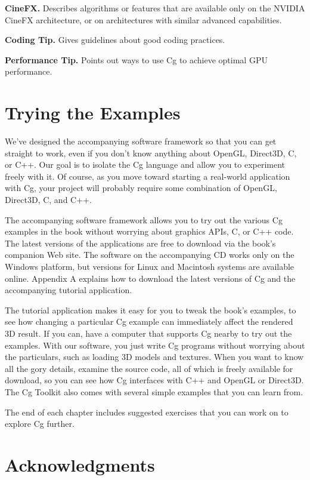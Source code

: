 \documentclass{book}
\begin{document}
\textbf{CineFX.} Describes algorithms or features that are available only on the NVIDIA CineFX architecture, or on architectures with similar advanced capabilities.

\textbf{Coding Tip.} Gives guidelines about good coding practices.

\textbf{Performance Tip.} Points out ways to use Cg to achieve optimal GPU performance.

\section*{Trying the Examples}

We've designed the accompanying software framework so that you can get straight to work, even if you don't know anything about OpenGL, Direct3D, C, or C++. Our goal is to isolate the Cg language and allow you to experiment freely with it. Of course, as you move toward starting a real-world application with Cg, your project will probably require some combination of OpenGL, Direct3D, C, and C++.

The accompanying software framework allows you to try out the various Cg examples in the book without worrying about graphics APIs, C, or C++ code. The latest versions of the applications are free to download via the book's companion Web site. The software on the accompanying CD works only on the Windows platform, but versions for Linux and Macintosh systems are available online. Appendix A explains how to download the latest versions of Cg and the accompanying tutorial application.

The tutorial application makes it easy for you to tweak the book's examples, to see how changing a particular Cg example can immediately affect the rendered 3D result. If you can, have a computer that supports Cg nearby to try out the examples. With our software, you just write Cg programs without worrying about the particulars, such as loading 3D models and textures. When you want to know all the gory details, examine the source code, all of which is freely available for download, so you can see how Cg interfaces with C++ and OpenGL or Direct3D. The Cg Toolkit also comes with several simple examples that you can learn from.

The end of each chapter includes suggested exercises that you can work on to explore Cg further.

\section*{Acknowledgments}
\end{document}
